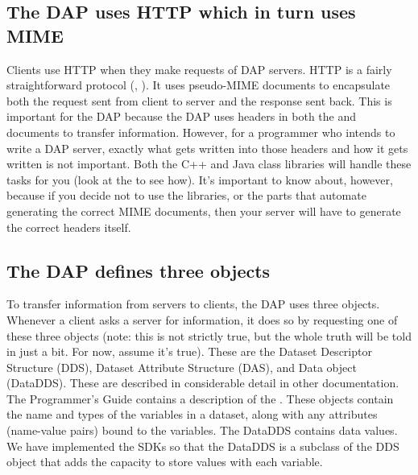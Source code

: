 \documentclass{dods-paper}
\begin{document}
\subsection{The DAP uses HTTP which in turn uses MIME}

Clients use HTTP when they make requests of DAP servers. HTTP is a fairly
straightforward protocol (, ).
It uses pseudo-MIME documents to encapsulate both the request sent from
client to server and the response sent back. This is important for the DAP
because the DAP uses headers in both the 
and 
documents to transfer information. However, for a programmer who intends to
write a DAP server, exactly what gets written into those headers and how it
gets written is not important. Both the C++ and Java class libraries will
handle these tasks for you (look at the 
to see how). It's important to know about, however, because if you decide not
to use the libraries, or the parts that automate generating the correct MIME
documents, then your server will have to generate the correct headers itself.

\subsection{The DAP defines three objects}

To transfer information from servers to clients, the DAP uses three objects.
Whenever a client asks a server for information, it does so by requesting one
of these three objects (note: this is not strictly true, but the whole truth
will be told in just a bit. For now, assume it's true). These are the Dataset
Descriptor Structure (DDS), Dataset Attribute Structure (DAS), and Data
object (DataDDS). These are described in considerable detail in other
documentation. The Programmer's Guide contains a description of the
.
These objects contain the name and types of the variables in a dataset, along
with any attributes (name-value pairs) bound to the variables. The DataDDS
contains data values. We have implemented the SDKs so that the DataDDS is a
subclass of the DDS object that adds the capacity to store values with each
variable.
\end{document}
